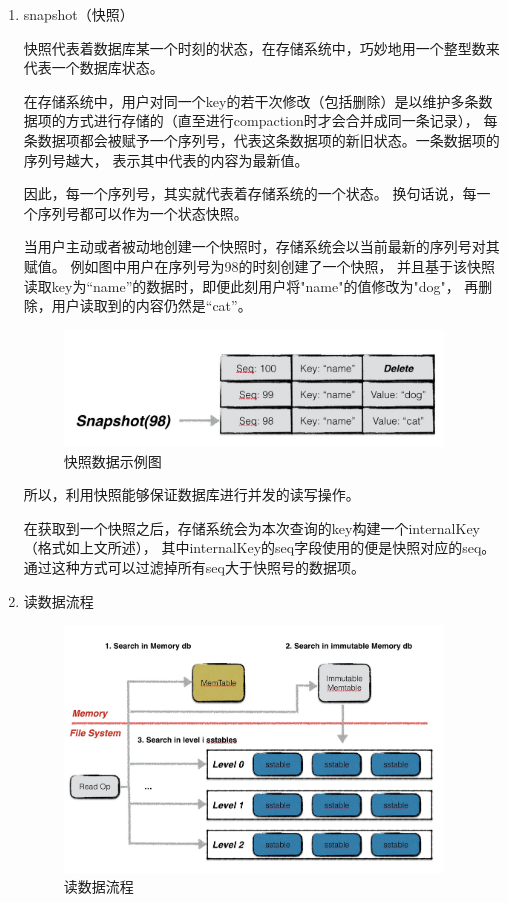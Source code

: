 	\begin{enumerate}
		\item snapshot（快照）
		
		快照代表着数据库某一个时刻的状态，在存储系统中，巧妙地用一个整型数来代表一个数据库状态。

		在存储系统中，用户对同一个key的若干次修改（包括删除）是以维护多条数据项的方式进行存储的（直至进行compaction时才会合并成同一条记录），
		每条数据项都会被赋予一个序列号，代表这条数据项的新旧状态。一条数据项的序列号越大，
		表示其中代表的内容为最新值。

		因此，每一个序列号，其实就代表着存储系统的一个状态。
		换句话说，每一个序列号都可以作为一个状态快照。

		当用户主动或者被动地创建一个快照时，存储系统会以当前最新的序列号对其赋值。
		例如图中用户在序列号为98的时刻创建了一个快照，
		并且基于该快照读取key为“name”的数据时，即便此刻用户将"name"的值修改为"dog"，
		再删除，用户读取到的内容仍然是“cat”。

		\begin{figure}[H]
			\centering
			\includegraphics[width=0.95\textwidth]{images/snapshot}
			\caption{快照数据示例图}
			\label{snapshot}
		\end{figure}

		所以，利用快照能够保证数据库进行并发的读写操作。

		在获取到一个快照之后，存储系统会为本次查询的key构建一个internalKey（格式如上文所述），
		其中internalKey的seq字段使用的便是快照对应的seq。
		通过这种方式可以过滤掉所有seq大于快照号的数据项。
		

		\item 读数据流程
		
		\begin{figure}[H]
			\centering
			\includegraphics[width=0.95\textwidth]{images/readop}
			\caption{读数据流程}
			\label{readop}
		\end{figure}


\end{enumerate}
